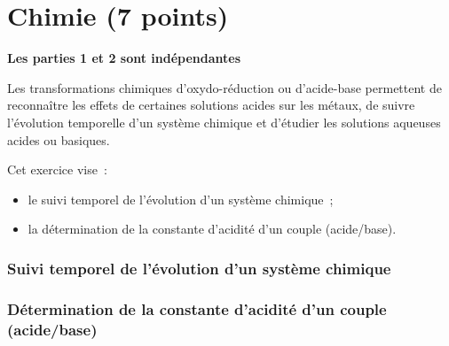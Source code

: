 \part*{Chimie (7 points)}
\begin{center}
    \textbf{Les parties 1 et 2 sont indépendantes}
\end{center}
Les transformations chimiques d'oxydo-réduction ou d'acide-base permettent de
reconnaître les effets de certaines solutions acides sur les métaux, de suivre
l'évolution temporelle d'un système chimique et d'étudier les solutions aqueuses
acides ou basiques.

Cet exercice vise~:
\begin{itemize}
    \item le suivi temporel de l'évolution d'un système chimique~;
    \item la détermination de la constante d'acidité d'un couple (acide/base).
\end{itemize}

\section{Suivi temporel de l'évolution d'un système chimique}


\section{Détermination de la constante d'acidité d'un couple (acide/base)}

